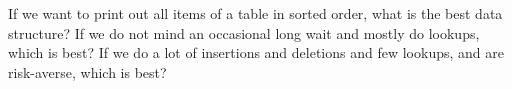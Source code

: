 \begin{Boxample}[6]
If we want to print out all items of a table in sorted order, what is the best data structure?
If we do not mind an occasional long wait and mostly do lookups, which is best?
If we do a lot of insertions and deletions and few lookups, and are risk-averse, which is best?
\end{Boxample}









